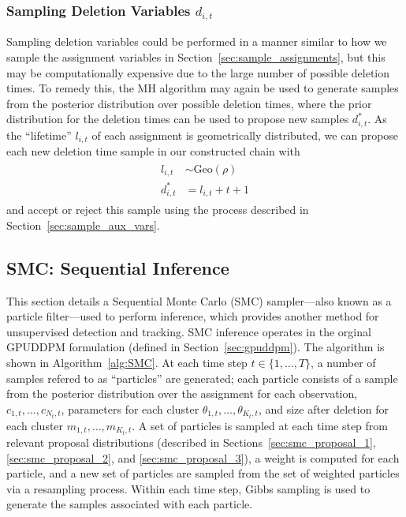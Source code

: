 \documentclass[twocolumn, final]{svjour3}
\begin{document}

\subsubsection{Sampling Deletion Variables $d_{i,t}$}
Sampling deletion variables could be performed in a manner similar to how we sample the assignment variables in Section~\ref{sec:sample_assignments}, but this may be computationally expensive due to the large number of possible deletion times. To remedy this, the MH algorithm may again be used to generate samples from the posterior distribution over possible deletion times, where the prior distribution for the deletion times can be used to propose new samples $d_{i,t}^{*}$. As the ``lifetime'' $l_{i,t}$ of each assignment is geometrically distributed, we can propose each new deletion time sample in our constructed chain with
\begin{align}
\begin{split}
l_{i,t}  &\sim  \text{Geo}(\rho)  \\
d_{i,t}^{*}  &= l_{i,t} + t + 1
\end{split}
\end{align}
and accept or reject this sample using the process described in Section~\ref{sec:sample_aux_vars}.


\subsection{SMC: Sequential Inference}
\label{sec:SMC}

This section details a Sequential Monte Carlo (SMC) sampler---also known as a particle filter---used to perform inference, which provides another method for unsupervised detection and tracking. SMC inference operates in the orginal GPUDDPM formulation (defined in Section~\ref{sec:gpuddpm}). The algorithm is shown in Algorithm~\ref{alg:SMC}. At each time step $t \in \{ 1, \ldots, T \}$, a number of samples refered to as ``particles'' are generated; each particle consists of a sample from the posterior distribution over the assignment for each observation, $c_{1,t}, \ldots, c_{N_{t}, t}$, parameters for each cluster $\theta_{1,t}, \ldots, \theta_{K_{t}, t}$, and size after deletion for each cluster $m_{1,t}, \ldots, m_{K_{t},t}$. A set of particles is sampled at each time step from relevant proposal distributions (described in Sections~\ref{sec:smc_proposal_1}, \ref{sec:smc_proposal_2}, and \ref{sec:smc_proposal_3}), a weight is computed for each particle, and a new set of particles are sampled from the set of weighted particles via a resampling process. Within each time step, Gibbs sampling is used to generate the samples associated with each particle.
\end{document}
